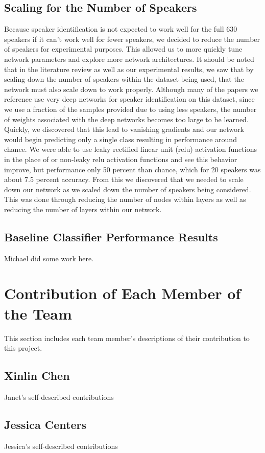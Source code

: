 \documentclass{article}
\begin{document}
\subsection{Scaling for the Number of Speakers}
Because speaker identification is not expected to work well for the full 630 speakers if it can't work well for fewer speakers, we decided to reduce the number of speakers for experimental purposes.
This allowed us to more quickly tune network parameters and explore more network architectures. 
It should be noted that in the literature review as well as our experimental results, we saw that by scaling down the number of speakers within the dataset being used, that the network must also scale down to work properly.
Although many of the papers we reference use very deep networks for speaker identification on this dataset, since we use a fraction of the samples provided due to using less speakers, the number of weights associated with the deep networks becomes too large to be learned.
Quickly, we discovered that this lead to vanishing gradients and our network would begin predicting only a single class resulting in performance around chance. 
We were able to use leaky rectified linear unit (relu) activation functions in the place of or non-leaky relu activation functions and see this behavior improve, but performance only 50 percent than chance, which for 20 speakers was about 7.5 percent accuracy.
From this we discovered that we needed to scale down our network as we scaled down the number of speakers being considered. 
This was done through reducing the number of nodes within layers as well as reducing the number of layers within our network.
\subsection{Baseline Classifier Performance Results}
Michael did some work here.

\section{Contribution of Each Member of the Team}
This section includes each team member's descriptions of their contribution to this project.
\subsection{Xinlin Chen}
Janet's self-described contributions
\subsection{Jessica Centers}
Jessica's self-described contributions
\end{document}
